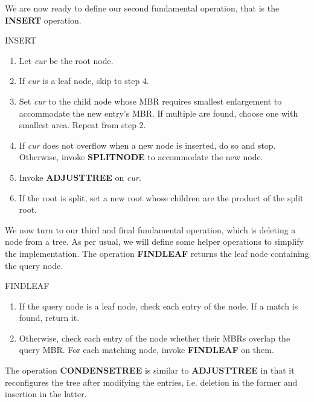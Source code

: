 \documentclass{article}
\begin{document}
We are now ready to define our second fundamental operation, that is the \textbf{INSERT} operation.

\begin{algorithm}{INSERT \cite{Guttman1984}}
	\begin{enumerate}
		\item Let \textit{cur} be the root node.
		\item If \textit{cur} is a leaf node, skip to step 4.
		\item Set \textit{cur} to the child node whose MBR requires smallest enlargement to accommodate the new entry's MBR. If multiple are found, choose one with smallest area. Repeat from step 2.
		\item If \textit{cur} does not overflow when a new node is inserted, do so and stop. Otherwise, invoke \textbf{SPLITNODE} to accommodate the new node.
		\item Invoke \textbf{ADJUSTTREE} on \textit{cur}.
		\item If the root is split, set a new root whose children are the product of the split root.
	\end{enumerate}
\end{algorithm}

We now turn to our third and final fundamental operation, which is deleting a node from a tree. As per usual, we will define some helper operations to simplify the implementation. The operation \textbf{FINDLEAF} returns the leaf node containing the query node.

\begin{algorithm}{FINDLEAF \cite{Guttman1984}}
	\begin{enumerate}
		\item If the query node is a leaf node, check each entry of the node. If a match is found, return it.
		\item Otherwise, check each entry of the node whether their MBRs overlap the query MBR. For each matching node, invoke \textbf{FINDLEAF} on them.
	\end{enumerate}
\end{algorithm}

The operation \textbf{CONDENSETREE} is similar to \textbf{ADJUSTTREE} in that it reconfigures the tree after modifying the entries, i.e. deletion in the former and insertion in the latter.
\end{document}
